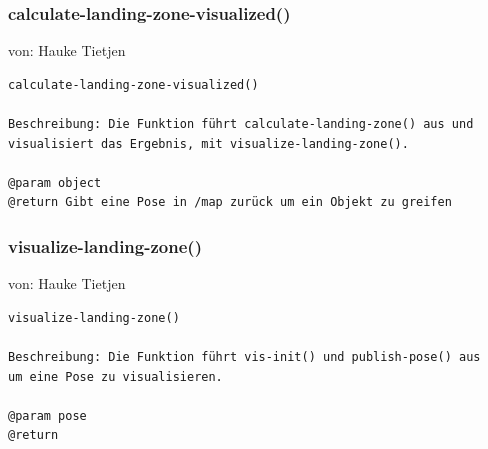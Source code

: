 \documentclass{suturo}
\makeatletter
\newcommand{\chapterauthor}[1]{%
  {\parindent0pt\vspace*{-27pt}%
  \linespread{0}\small\begin{flushright}von: #1\end{flushright}%
  \par\nobreak\vspace*{0pt}}
  \@afterheading%
}
\makeatother
\begin{document}
\begin{figure}[!htb]
\end{figure}

\subsubsection{calculate-landing-zone-visualized()}
\chapterauthor{Hauke Tietjen}
\begin{verbatim}
calculate-landing-zone-visualized()

Beschreibung: Die Funktion führt calculate-landing-zone() aus und
visualisiert das Ergebnis, mit visualize-landing-zone().

@param object
@return Gibt eine Pose in /map zurück um ein Objekt zu greifen
\end{verbatim}

\subsubsection{visualize-landing-zone()}
\chapterauthor{Hauke Tietjen}
\begin{verbatim}
visualize-landing-zone()

Beschreibung: Die Funktion führt vis-init() und publish-pose() aus
um eine Pose zu visualisieren.

@param pose
@return 
\end{verbatim}
\end{document}
